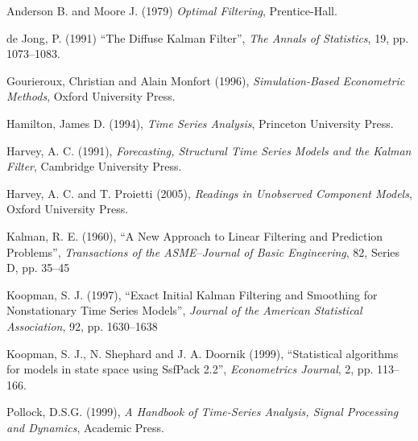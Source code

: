 \documentclass[a4paper]{article}
\begin{document}
\begin{thebibliography}

  Anderson B. and Moore J. (1979) \emph{Optimal Filtering}, Prentice-Hall.

  de Jong, P. (1991) ``The Diffuse Kalman Filter'', \emph{The Annals
    of Statistics}, 19, pp. 1073--1083.

  Gourieroux, Christian and Alain Monfort (1996),
  \emph{Simulation-Based Econometric Methods}, Oxford University
  Press.

  Hamilton, James D. (1994), \emph{Time Series Analysis}, Princeton
  University Press.

  Harvey, A. C. (1991), \emph{Forecasting, Structural Time Series
    Models and the Kalman Filter}, Cambridge University Press.

  Harvey, A. C. and T. Proietti (2005), \emph{Readings in Unobserved
    Component Models}, Oxford University Press.

  Kalman, R. E. (1960), ``A New Approach to Linear Filtering and
  Prediction Problems'', \emph{Transactions of the ASME--Journal of
    Basic Engineering}, 82, Series D, pp. 35--45

  Koopman, S. J. (1997), ``Exact Initial Kalman Filtering and
  Smoothing for Nonstationary Time Series Models'', \emph{Journal of
    the American Statistical Association}, 92, pp. 1630--1638

  Koopman, S. J., N. Shephard and J. A. Doornik (1999), 
  ``Statistical algorithms for models in state space using SsfPack
  2.2'', \emph{Econometrics Journal}, 2, pp. 113--166.
  
  Pollock, D.S.G. (1999), \emph{A Handbook of Time-Series Analysis,
    Signal Processing and Dynamics}, Academic Press.

\end{thebibliography}
\end{document}
